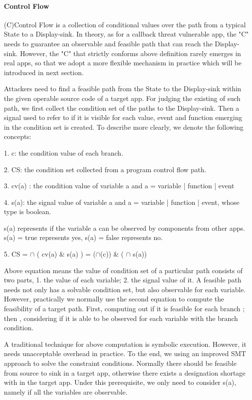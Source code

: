 \documentclass{sig-alternate-05-2015}
\begin{document}
\paragraph{Control Flow}

(C)Control Flow is a collection of conditional values over the path from a typical State to a Display-sink. In theory, as for a callback threat vulnerable app, the "C" needs to guarantee an observable and feasible path that can reach the Display-sink. However, the "C" that strictly conforms above definition rarely emerges in real apps, so that we adopt a more flexible mechanism in practice which will be introduced in next section.  

Attackers need to find a feasible path from the State to the Display-sink within the given operable source code of a target app. For judging the existing of such path, we first collect the condition set of the paths to the Display-sink. Then a signal used to refer to if it is visible for each value, event and function emerging in the condition set is created. To describe more clearly, we denote the following concepts:

1. c: the condition value of each branch.

2. CS: the condition set collected from a program control flow path.

3. cv(a) : the condition value of variable a and a = variable | function | event

4. s(a): the signal value of variable a and a = variable | function | event, whose type is boolean.

s(a) represents if the variable a can be observed by components from other apps. s(a) = true represents yes, s(a) = false represents no.

5. CS = $\cap$ ( cv(a) \& s(a) ) = ($\cap$(c)) \& ( $\cap$ s(a))

Above equation means the value of condition set of a particular path consists of two parts, 1. the value of each variable; 2. the signal value of it. A feasible path needs not only has a solvable condition set, but also observable for each variable. However, practically we normally use the second equation to compute the feasibility of a target path. First, computing out if it is feasible for each branch ; then , considering if it is able to be observed for each variable with the branch condition.

A traditional technique for above computation is symbolic execution. However, it needs unacceptable overhead in practice. {\color {red} To the end, we using an improved SMT approach to solve the constraint conditions.} Normally there should be feasible from source to sink in a target app, otherwise there exists a designation shortage with in the target app. Under this prerequisite, we only need to consider s(a), namely if all the variables are observable. 
\end{document}
